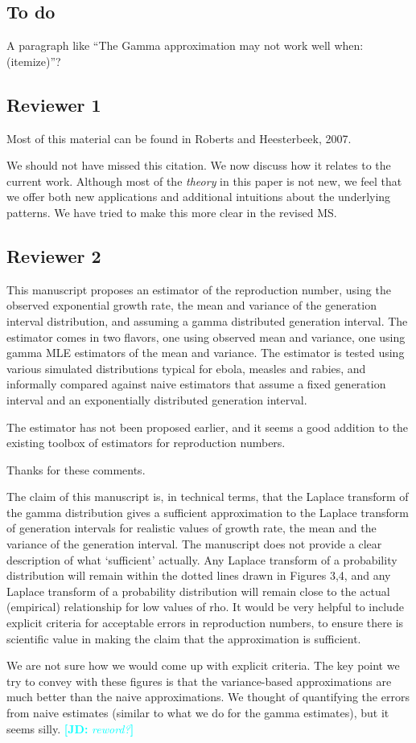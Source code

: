 \documentclass[12pt]{article}
\newcommand{\rev}{\subsection*}
\newcommand{\revtext}{\textsf}
\newcommand{\comment}[3]{\textcolor{#1}{\textbf{[#2: }\textsl{#3}\textbf{]}}}
\newcommand{\jd}[1]{\comment{cyan}{JD}{#1}}
\begin{document}
\rev{To do}

A paragraph like ``The Gamma approximation may not work well when: (itemize)''? 

\rev{Reviewer 1}

\revtext{Most of this material can be found in Roberts and Heesterbeek, 2007.}

We should not have missed this citation. We now discuss how it relates to the current work. Although most of the \emph{theory} in this paper is not new, we feel that we offer both new applications and additional intuitions about the underlying patterns. We have tried to make this more clear in the revised MS.

\rev{Reviewer 2}

\revtext{This manuscript proposes an estimator of the reproduction number, using the observed exponential growth rate, the mean and variance of the generation interval distribution, and assuming a gamma distributed generation interval. The estimator comes in two flavors, one using observed mean and variance, one using gamma MLE estimators of the mean and variance. The estimator is tested using various simulated distributions typical for ebola, measles and rabies, and informally compared against naive estimators that assume a fixed generation interval and an exponentially distributed generation interval.}

\revtext{The estimator has not been proposed earlier, and it seems a good addition to the existing toolbox of estimators for reproduction numbers.}

Thanks for these comments.

\revtext{The claim of this manuscript is, in technical terms, that the Laplace transform of the gamma distribution gives a sufficient approximation to the Laplace transform of generation intervals for realistic values of growth rate, the mean and the variance of the generation interval. The manuscript does not provide a clear description of what `sufficient’ actually. Any Laplace transform of a probability distribution will remain within the dotted lines drawn in Figures 3,4, and any Laplace transform of a probability distribution will remain close to the actual (empirical) relationship for low values of rho. It would be very helpful to include explicit criteria for acceptable errors in reproduction numbers, to ensure there is scientific value in making the claim that the approximation is sufficient.}

We are not sure how we would come up with explicit criteria. The key point we try to convey with these figures is that the variance-based approximations are much better than the naive approximations. We thought of quantifying the errors from naive estimates (similar to what we do for the gamma estimates), but it seems silly. \jd{reword?}
\end{document}
